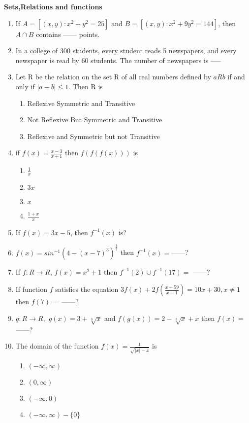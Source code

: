 \documentclass[12pt]{article}
\begin{document}
\begin{center}
    {\LARGE \textbf{Sets,Relations and functions} }
\end{center}
\begin{enumerate}
    \item If $A = [(x, y) : x^2 + y^2 = 25]$ and $B = [(x, y) : x^2 + 9y^2 = 144]$, then $A \cap B$ contains ------ points.
    \item  In a college of 300 students, every student reads 5 newspapers, and every newspaper is read by 60 students. The number of newspapers is -----
    \item  Let R be the relation on the set R of all real numbers defined by $a R b$ if and only if $|a - b| \leq 1$. Then R is
     \begin{enumerate}
        \item Reflexive Symmetric and Transitive
        \item Not Reflexive But Symmetric and Transitive
        \item Reflexive and Symmetric but not Transitive
    \end{enumerate}
    \item if $f(x)=\frac{x-3}{x+1}$ then $f(f(f(x)))$ is 
     \begin{enumerate}
        \item $\frac{1}{x}$
        \item $3x$
        \item $x$
        \item $\frac{1+x}{x}$
    \end{enumerate}
    \item  If $f (x) = 3x - 5$, then $f^{-1}(x)$ is?
    \item $f(x)=sin^{-1}(4-(x-7)^3)^{\frac{1}{7}}$ then $f^{-1}(x)=$------?
    \item If $f:R \rightarrow R$, $f(x)=x^2+1$ then $f^{-1}(2) \cup f^{-1}(17)=$ ------?
    \item If function $f$ satisfies the equation $3f(x)+2f(\frac{x+59}{x-1})=10x+30, x \not = 1$ then $f(7)=$ ------?
    \item $g:R \rightarrow R,$ $g(x)=3+\sqrt[3]{x}$ and $f(g(x))=2-\sqrt[3]{x}+x$ then $f(x)=$ ------?
    \item The domain of the function $f(x)=\frac{1}{\sqrt{|x|-x}}$ is 
    \begin{enumerate}
        \item $(-\infty,\infty)$
        \item $(0,\infty)$
        \item $(-\infty, 0)$
        \item $(-\infty,\infty)-\{0\}$
    \end{enumerate}
   
\end{enumerate}
\end{document}
